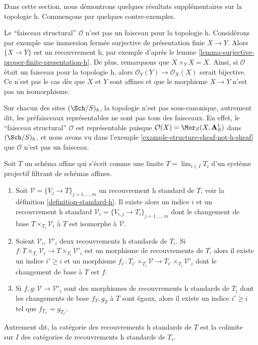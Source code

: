 \noindent
Dans cette section, nous démontrons quelques résultats supplémentaires sur la topologie h.
Commençons par quelques contre-exemples.

\begin{example}
\label{example-structure-sheaf-not-h-sheaf}
Le ``faisceau structural'' $\mathcal{O}$ n'est pas un faisceau pour la topologie h.
Considérons par exemple une immersion fermée surjective de
présentation finie $X \to Y$. Alors $\{X \to Y\}$ est un recouvrement h,
par exemple d'après le lemme \ref{lemma-surjective-proper-finite-presentation-h}.
De plus, remarquons que $X \times_Y X = X$.
Ainsi, si $\mathcal{O}$ était un faisceau pour la topologie h, alors
$\mathcal{O}_Y(Y) \to \mathcal{O}_X(X)$ serait bijective.
Ce n'est pas le cas dès que $X$ et $Y$ sont affines et que le morphisme
$X \to Y$ n'est pas un isomorphisme.
\end{example}

\begin{example}
\label{example-representable-sheaf-not-h-sheaf}
Sur chacun des sites $(\Sch/S)_h$, la topologie n'est pas sous-canonique,
autrement dit, les préfaisceaux représentables ne sont pas tous des faisceaux.
En effet, le ``faisceau structural'' $\mathcal{O}$ est représentable
puisque $\mathcal{O}(X) = \Mor_S(X, \mathbf{A}^1_S)$
dans $(\Sch/S)_h$, et nous avons vu dans
l'exemple \ref{example-structure-sheaf-not-h-sheaf}
que $\mathcal{O}$ n'est pas un faisceau.
\end{example}

\begin{lemma}
\label{lemma-limit-h-topology}
Soit $T$ un schéma affine qui s'écrit comme une limite
$T = \lim_{i \in I} T_i$ d'un système projectif filtrant de schémas affines.
\begin{enumerate}
\item Soit $\mathcal{V} = \{V_j \to T\}_{j = 1, \ldots, m}$ un
recouvrement h standard de $T$, voir la définition
\ref{definition-standard-h}.
Il existe alors un indice $i$ et un recouvrement h standard
$\mathcal{V}_i = \{V_{i, j} \to T_i\}_{j = 1, \ldots, m}$
dont le changement de base $T \times_{T_i} \mathcal{V}_i$ à $T$
est isomorphe à $\mathcal{V}$.
\item Soient $\mathcal{V}_i$, $\mathcal{V}'_i$ deux recouvrements h standards
de $T_i$. Si
$f : T \times_{T_i} \mathcal{V}_i \to T \times_{T_i} \mathcal{V}'_i$ est
un morphisme de recouvrements de $T$, alors il existe un indice
$i' \geq i$ et un morphisme
$f_{i'} : T_{i'} \times_{T_i} \mathcal{V} \to
T_{i'} \times_{T_i} \mathcal{V}'_i$
dont le changement de base à $T$ est $f$.
\item Si
$f, g : \mathcal{V} \to \mathcal{V}'_i$
sont des morphismes de recouvrements h standards de $T_i$ dont les
changements de base $f_T, g_T$ à $T$ sont égaux, alors il existe un
indice $i' \geq i$ tel que $f_{T_{i'}} = g_{T_{i'}}$.
\end{enumerate}
Autrement dit, la catégorie des recouvrements h standards de $T$ est
la colimite sur $I$ des catégories de recouvrements h standards de $T_i$.
\end{lemma}

